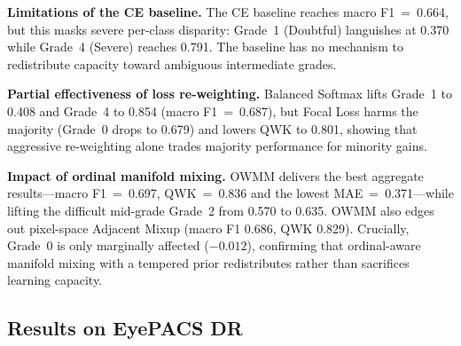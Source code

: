\documentclass[runningheads]{svproc}
\begin{document}
\textbf{Limitations of the CE baseline.} The CE baseline reaches macro F1~=~0.664, but this masks severe per-class disparity: Grade~1 (Doubtful) languishes at 0.370 while Grade~4 (Severe) reaches 0.791. The baseline has no mechanism to redistribute capacity toward ambiguous intermediate grades.

\textbf{Partial effectiveness of loss re-weighting.} Balanced Softmax lifts Grade~1 to 0.408 and Grade~4 to 0.854 (macro F1~=~0.687), but Focal Loss harms the majority (Grade~0 drops to 0.679) and lowers QWK to 0.801, showing that aggressive re-weighting alone trades majority performance for minority gains.

\textbf{Impact of ordinal manifold mixing.} OWMM delivers the best aggregate results---macro F1~=~0.697, QWK~=~0.836 and the lowest MAE~=~0.371---while lifting the difficult mid-grade Grade~2 from 0.570 to 0.635. OWMM also edges out pixel-space Adjacent Mixup (macro F1 0.686, QWK 0.829). Crucially, Grade~0 is only marginally affected ($-0.012$), confirming that ordinal-aware manifold mixing with a tempered prior redistributes rather than sacrifices learning capacity.

\FloatBarrier
\subsection{Results on EyePACS DR}


\begin{table}[!ht]
\centering
\caption{Per-class F1, macro F1, QWK and MAE on EyePACS DR (test, seed~123). OWMM uses $\gamma=0.25$, selected on validation macro F1. Best per column in bold. Support: DR~0=5161, DR~1=487, DR~2=1058, DR~3=175, DR~4=141.}
\label{tab:eyepacs}
\small
\setlength\tabcolsep{4pt}
\end{table}
\end{document}
